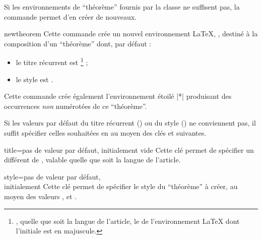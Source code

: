 Si les environnements de \enquote{théorème} fournis par la classe ne suffisent
pas, la commande  permet d'en créer de nouveaux.

\begin{docCommand}{newtheorem}{}
  Cette commande crée un nouvel environnement \LaTeX{}, , destiné à la
  composition d'un \enquote{théorème} dont, par défaut :
  \begin{itemize}
  \item le titre récurrent est \footnote{\Ie*{}, quelle que soit la
      langue de l'article, le  de l'environnement \LaTeX{} dont
      l'initiale est en majuscule.} ;
  \item le style est .
  \end{itemize}
  Cette commande crée également l'environnement étoilé |*| produisant
  des occurrences \emph{non} numérotées de ce \enquote{théorème}.

  Si les valeurs par défaut du titre récurrent () ou du style
  () ne conviennent pas, il suffit spécifier celles souhaitées
  en  au moyen des clés  et 
  suivantes.
  \begin{docKey}{title}{={}}{pas de
      valeur par défaut, initialement vide}
    Cette clé permet de spécifier un  différent de
    , valable quelle que soit la langue de l'article.
  \end{docKey}
  \begin{docKey}{style}{=\textbar{}\textbar{}}{pas
      de valeur par défaut,\\initialement {}}
    Cette clé permet de spécifier le style du \enquote{théorème} à créer, au
    moyen des valeurs ,  et
    .
  \end{docKey}


\end{docCommand}
